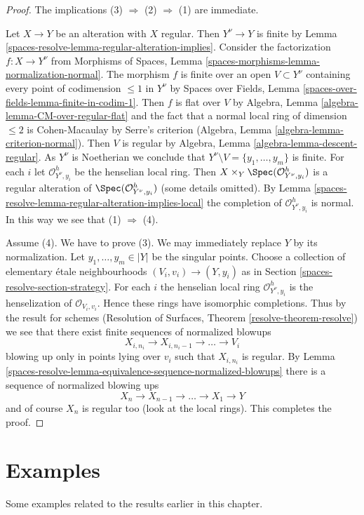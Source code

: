 \begin{proof}
The implications (3) $\Rightarrow$ (2) $\Rightarrow$ (1) are immediate.

\medskip\noindent
Let $X \to Y$ be an alteration with $X$ regular. Then $Y^\nu \to Y$
is finite by Lemma \ref{spaces-resolve-lemma-regular-alteration-implies}.
Consider the factorization $f : X \to Y^\nu$ from
Morphisms of Spaces, Lemma \ref{spaces-morphisms-lemma-normalization-normal}.
The morphism $f$ is finite over an open $V \subset Y^\nu$ containing
every point of codimension $\leq 1$ in $Y^\nu$
by Spaces over Fields, Lemma \ref{spaces-over-fields-lemma-finite-in-codim-1}.
Then $f$ is flat over $V$ by
Algebra, Lemma \ref{algebra-lemma-CM-over-regular-flat}
and the fact that a normal local ring
of dimension $\leq 2$ is Cohen-Macaulay by Serre's criterion
(Algebra, Lemma \ref{algebra-lemma-criterion-normal}).
Then $V$ is regular by Algebra, Lemma \ref{algebra-lemma-descent-regular}.
As $Y^\nu$ is Noetherian we conclude that
$Y^\nu \setminus V = \{y_1, \ldots, y_m\}$ is finite.
For each $i$ let $\mathcal{O}_{Y^\nu, y_i}^h$ be the henselian
local ring. Then $X \times_Y \Spec(\mathcal{O}_{Y^\nu, y_i}^h)$
is a regular alteration of $\Spec(\mathcal{O}_{Y^\nu, y_i}^h)$
(some details omitted).
By Lemma \ref{spaces-resolve-lemma-regular-alteration-implies-local}
the completion of $\mathcal{O}_{Y^\nu, y_i}^h$ is normal.
In this way we see that (1) $\Rightarrow$ (4).

\medskip\noindent
Assume (4). We have to prove (3). We may immediately replace
$Y$ by its normalization. Let $y_1, \ldots, y_m \in |Y|$ be the
singular points. Choose a collection of elementary \'etale neighbourhoods
$(V_i, v_i) \to (Y, y_i)$ as in Section \ref{spaces-resolve-section-strategy}.
For each $i$ the henselian local ring $\mathcal{O}_{Y^\nu, y_i}^h$
is the henselization of $\mathcal{O}_{V_i, v_i}$.
Hence these rings have isomorphic completions.
Thus by the result for schemes
(Resolution of Surfaces, Theorem \ref{resolve-theorem-resolve})
we see that there exist finite sequences of normalized blowups
$$
X_{i, n_i} \to X_{i, n_i - 1} \to \ldots \to V_i
$$
blowing up only in points lying over $v_i$ such that $X_{i, n_i}$
is regular. By Lemma \ref{spaces-resolve-lemma-equivalence-sequence-normalized-blowups}
there is a sequence of normalized blowing ups
$$
X_n \to X_{n - 1} \to \ldots \to X_1 \to Y
$$
and of course $X_n$ is regular too (look at the local rings).
This completes the proof.
\end{proof}

\section{Examples}
\label{spaces-resolve-section-examples}
Some examples related to the results earlier in this chapter.

